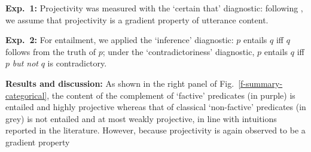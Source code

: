 \documentclass[12pt,fleqn]{article}
\newcommand{\6}{\mbox{$[\hspace*{-.6mm}[$}}
\newcommand{\9}{\mbox{$]\hspace*{-.6mm}]$}}
\begin{document}
{\bf Exp.~1:} Projectivity was measured with the `certain that' diagnostic: following \cite*{tbd-variability}, we assume that projectivity is a gradient property of utterance content. 

{\bf Exp.~2:} For entailment, we applied the `inference' diagnostic: $p$ entails $q$ iff $q$ follows from the truth of $p$; under the `contradictoriness' diagnostic, $p$ entails $q$ iff $p$ {\em but not} $q$ is contradictory. 

{\bf Results and discussion:} As shown in the right panel of Fig.\ \ref{f-summary-categorical}, the content of the complement of `factive' predicates (in purple) is entailed and highly projective whereas that of classical `non-factive' predicates (in grey) is not entailed and at most weakly projective, in line with intuitions reported in the literature. However, because projectivity is again observed to be a gradient property
\end{document}
